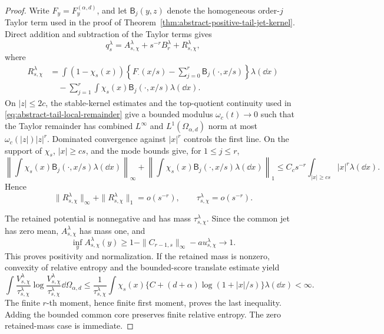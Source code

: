 \begin{proof}
Write \(F_y=F_y^{(\alpha,d)}\), and let \(\mathsf B_j(y,z)\) denote the
homogeneous order-\(j\) Taylor term used in the proof of
Theorem~\ref{thm:abstract-positive-tail-jet-kernel}.  Direct addition and
subtraction of the Taylor terms gives
\begin{equation}\label{eq:convention-exact-tail-split}
 q_s^\lambda=A_{s,\chi}^\lambda+s^{-r}B_r^\lambda
                  +R_{s,\chi}^\lambda,
\end{equation}
where
\begin{align*}
 R_{s,\chi}^\lambda
 &=\int(1-\chi_s(x))
   \left\{F_\cdot(x/s)-\sum_{j=0}^r
                  \mathsf B_j(\cdot,x/s)\right\}\lambda(\dd x)\\
 &\quad-\sum_{j=1}^r\int\chi_s(x)
                  \mathsf B_j(\cdot,x/s)\lambda(\dd x).
\end{align*}
On \(|z|\le2c\), the stable-kernel estimates and the top-quotient
continuity used in \eqref{eq:abstract-tail-local-remainder} give a bounded
modulus \(\omega_c(t)\to0\) such that the Taylor remainder has combined
\(L^\infty\) and \(L^1(\Omega_{\alpha,d})\) norm at most
\(\omega_c(|z|)|z|^r\).  Dominated convergence against \(|x|^r\) controls
the first line.  On the support of \(\chi_s\),
\(|x|\ge cs\), and the mode bounds give, for \(1\le j\le r\),
\[
 \left\|\int\chi_s(x)\mathsf B_j(\cdot,x/s)\lambda(\dd x)\right\|_\infty
 +\left\|\int\chi_s(x)\mathsf B_j(\cdot,x/s)\lambda(\dd x)\right\|_1
 \le C_cs^{-r}\int_{|x|\ge cs}|x|^r\lambda(\dd x).
\]
Hence
\begin{equation}\label{eq:convention-remainder-smallness}
 \|R_{s,\chi}^\lambda\|_\infty+
 \|R_{s,\chi}^\lambda\|_1=o(s^{-r}),
 \qquad \tau_{s,\chi}^\lambda=o(s^{-r}).
\end{equation}

The retained potential is nonnegative and has mass
\(\tau_{s,\chi}^\lambda\).  Since the common jet has zero mean,
\(A_{s,\chi}^\lambda\) has mass one, and
\[
 \inf_yA_{s,\chi}^\lambda(y)
 \ge1-\|C_{r-1,s}\|_\infty-	au_{s,\chi}^\lambda\longrightarrow1.
\]
This proves positivity and normalization.  If the retained mass is nonzero,
convexity of relative entropy and the bounded-score translate estimate yield
\[
 \int \frac{V_{s,\chi}^\lambda}{\tau_{s,\chi}^\lambda}
 \log\frac{V_{s,\chi}^\lambda}{\tau_{s,\chi}^\lambda}
 \dd\Omega_{\alpha,d}
 \le\frac1{\tau_{s,\chi}^\lambda}
 \int\chi_s(x)\{C+(d+\alpha)\log(1+|x|/s)\}\lambda(\dd x)<\infty.
\]
The finite \(r\)-th moment, hence finite first moment, proves the last
inequality.  Adding the bounded common core preserves finite relative
entropy.  The zero retained-mass case is immediate.


\end{proof}

